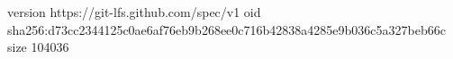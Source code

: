 version https://git-lfs.github.com/spec/v1
oid sha256:d73cc2344125c0ae6af76eb9b268ee0c716b42838a4285e9b036c5a327beb66c
size 104036
